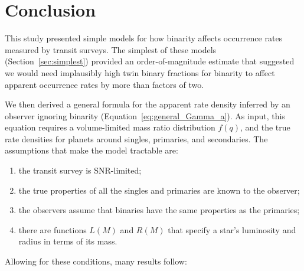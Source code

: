 \documentclass[12pt,modern]{aastex61}
\begin{document}
%

\section{Conclusion}
\label{sec:conclusion}

This study presented simple models for how binarity affects occurrence 
rates measured by transit surveys.
The simplest of these models (Section~\ref{sec:simplest}) provided an 
order-of-magnitude estimate that suggested we would need implausibly high twin 
binary fractions for binarity to affect apparent occurrence rates by more than 
factors of two.

We then derived a general formula for the apparent rate density inferred by an 
observer ignoring binarity (Equation~\ref{eq:general_Gamma_a}).
As input, this equation requires a volume-limited mass ratio distribution 
$f(q)$, and the true rate densities for planets around singles, 
primaries, and secondaries.
The assumptions that make the model tractable are:
\begin{enumerate}
    \item the transit survey is SNR-limited;
    \item the true properties of all the singles and primaries are known to 
    the observer;
    \item the observers assume that binaries have the same properties as the 
    primaries;
    \item there are functions $L(M)$ and $R(M)$ that specify a star's 
    luminosity and radius in terms of its mass.
\end{enumerate}
Allowing for these conditions, many results follow:
\end{document}
